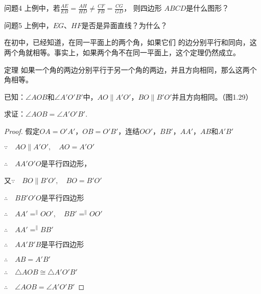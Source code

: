 \begin{blk}{问题4}
  上例中，若$\frac{AE}{EB}=\frac{AH}{HD}\ne \frac{CF}{FB}=\frac{CG}{GD}$，
则四边形
$ABCD$是什么图形？
\end{blk}

\begin{blk}{问题5}
  上例中，$EG$、$HF$是否是异面直线？为什么？
\end{blk}


在初中，已经知道，在同一平面上的两个角，如果它们
的边分别平行和同向，这两个角就相等。事实上，如果两个角不在同一平面上，这个定理仍然成立。

\begin{blk}
  {定理} 如果一个角的两边分别平行于另一个角的两边，并且方向相同，那么这两个角相等。
\end{blk}

已知：$\angle AOB$和$\angle A'O'B'$中，$AO\parallel A'O'$，$BO\parallel B'O'$并且方向相同。（图1.29）

求证：$\angle AOB=\angle A'O'B'$.

\begin{figure}[htp]
  \centering
{}
  \caption{}
\end{figure}

\begin{proof}
  假定$OA=O'A'$，$OB=O'B'$，连结$OO'$，$BB'$，$AA'$，$AB$和$A'B'$

$\because \quad AO\parallel A'O',\quad AO=A'O'$

$\therefore\quad AA'O'O$是平行四边形，

又$\because\quad BO\parallel B'O',\quad BO=B'O'$

$\therefore\quad BB'O'O$是平行四边形

$\therefore\quad AA'\displaystyle\mathop{=}^{\parallel} OO',\quad BB'\displaystyle\mathop{=}^{\parallel}OO'$

$\therefore\quad AA'\displaystyle\mathop{=}^{\parallel}BB'$

$\therefore\quad AA'B'B$是平行四边形

$\therefore\quad AB=A'B'$

$\therefore\quad \triangle AOB\cong\triangle A'O'B'$

$\therefore\quad \angle AOB=\angle A'O'B'$
\end{proof}


